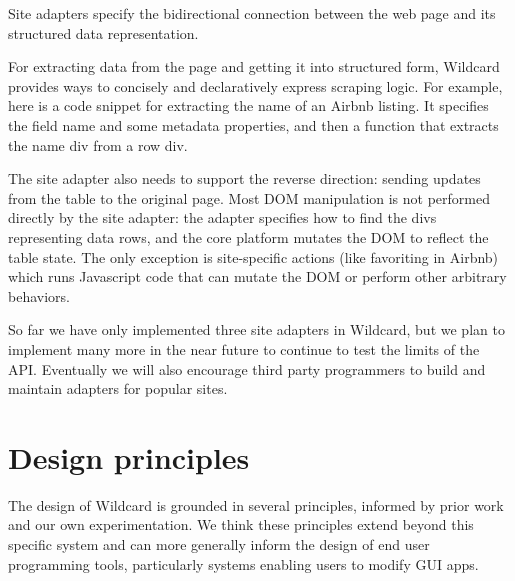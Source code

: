\documentclass[english,submission]{programming}
\newenvironment{Shaded}{}{}
\newcommand{\FunctionTok}[1]{\textcolor[rgb]{0.02,0.16,0.49}{#1}}
\newcommand{\KeywordTok}[1]{\textcolor[rgb]{0.00,0.44,0.13}{\textbf{#1}}}
\newcommand{\NormalTok}[1]{#1}
\newcommand{\OperatorTok}[1]{\textcolor[rgb]{0.40,0.40,0.40}{#1}}
\newcommand{\SpecialCharTok}[1]{\textcolor[rgb]{0.25,0.44,0.63}{#1}}
\newcommand{\StringTok}[1]{\textcolor[rgb]{0.25,0.44,0.63}{#1}}
\newcommand{\VariableTok}[1]{\textcolor[rgb]{0.10,0.09,0.49}{#1}}
\newcommand{\VerbatimStringTok}[1]{\textcolor[rgb]{0.25,0.44,0.63}{#1}}
\begin{document}
Site adapters specify the bidirectional connection between the web page
and its structured data representation.

For extracting data from the page and getting it into structured form,
Wildcard provides ways to concisely and declaratively express scraping
logic. For example, here is a code snippet for extracting the name of an
Airbnb listing. It specifies the field name and some metadata
properties, and then a function that extracts the name div from a row
div.

\begin{Shaded}
\end{Shaded}

The site adapter also needs to support the reverse direction: sending
updates from the table to the original page. Most DOM manipulation is
not performed directly by the site adapter: the adapter specifies how to
find the divs representing data rows, and the core platform mutates the
DOM to reflect the table state. The only exception is site-specific
actions (like favoriting in Airbnb) which runs Javascript code that can
mutate the DOM or perform other arbitrary behaviors.

So far we have only implemented three site adapters in Wildcard, but we
plan to implement many more in the near future to continue to test the
limits of the API. Eventually we will also encourage third party
programmers to build and maintain adapters for popular sites.

\hypertarget{design-principles}{%
\section{Design principles}\label{design-principles}}

The design of Wildcard is grounded in several principles, informed by
prior work and our own experimentation. We think these principles extend
beyond this specific system and can more generally inform the design of
end user programming tools, particularly systems enabling users to
modify GUI apps.
\end{document}
